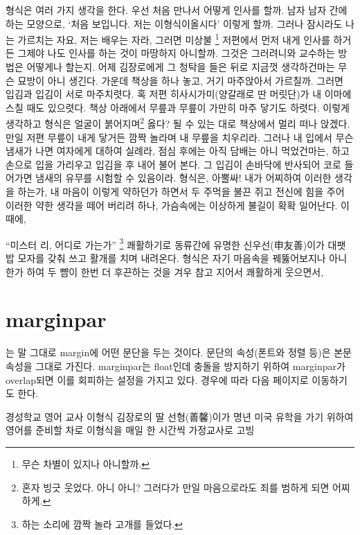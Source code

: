 \documentclass{oblivoir}
\begin{document}
형식은 여러 가지 생각을 한다. 우선 처음 만나서 어떻게 인사를 할까. 남자 남자 간에 하는 모양으로, ‘처음 보입니다. 저는 이형식이올시다’ 이렇게 할까. 그러나 잠시라도 나는 가르치는 자요, 저는 배우는 자라, 그러면 미상불 \footnote{무슨 차별이 있지나 아니할까.} 저편에서 먼저 내게 인사를 하거든 그제야 나도 인사를 하는 것이 마땅하지 아니할까. 그것은 그러려니와 교수하는 방법은 어떻게나 할는지. 어제 김장로에게 그 청탁을 들은 뒤로 지금껏 생각하건마는 무슨 묘방이 아니 생긴다. 가운데 책상을 하나 놓고, 거기 마주앉아서 가르칠까. 그러면 입김과 입김이 서로 마주치렷다. 혹 저편 히사시가미(양갈래로 딴 머릿단)가 내 이마에 스칠 때도 있으렷다. 책상 아래에서 무릎과 무릎이 가만히 마주 닿기도 하렷다. 이렇게 생각하고 형식은 얼굴이 붉어지며\footnote{혼자 빙긋 웃었다. 아니 아니? 그러다가 만일 마음으로라도 죄를 범하게 되면 어찌하게.} 옳다? 될 수 있는 대로 책상에서 멀리 떠나 앉겠다. 만일 저편 무릎이 내게 닿거든 깜짝 놀라며 내 무릎을 치우리라. 그러나 내 입에서 무슨 냄새가 나면 여자에게 대하여 실례라, 점심 후에는 아직 담배는 아니 먹었건마는, 하고 손으로 입을 가리우고 입김을 후 내어 불어 본다. 그 입김이 손바닥에 반사되어 코로 들어가면 냄새의 유무를 시험할 수 있음이라. 형식은, 아뿔싸! 내가 어찌하여 이러한 생각을 하는가, 내 마음이 이렇게 약하던가 하면서 두 주먹을 불끈 쥐고 전신에 힘을 주어 이러한 약한 생각을 떼어 버리려 하나, 가슴속에는 이상하게 불길이 확확 일어난다. 이때에,

“미스터 리, 어디로 가는가” \footnote{하는 소리에 깜짝 놀라 고개를 들었다.} 쾌활하기로 동류간에 유명한 신우선(申友善)이가 대팻밥 모자를 갖춰 쓰고 활개를 치며 내려온다. 형식은 자기 마음속을 꿰뚫어보지나 아니한가 하여 두 뺨이 한번 더 후끈하는 것을 겨우 참고 지어서 쾌활하게 웃으면서, 

\newpage

\section{marginpar}

\begin{framed}
는 말 그대로 margin에 어떤 문단을 두는 것이다. 문단의 속성(폰트와 정렬 등)은
본문 속성을 그대로 가진다. marginpar는 float인데 충돌을 방지하기 위하여 marginpar가 overlap되면 이를 회피하는 설정을 가지고 있다. 경우에 따라 다음 페이지로 이동하기도 한다.
\end{framed}

경성학교 영어 교사 이형식 김장로의 딸 선형(善馨)이가 명년 미국 유학을 가기 위하여 영어를 준비할 차로 이형식을 매일 한 시간씩 가정교사로 고빙
\end{document}
